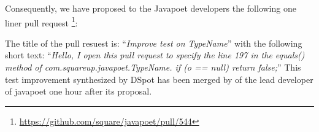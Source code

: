 \documentclass[table,xcdraw,smallextended]{svjour3}
\begin{document}
Consequently, we have proposed to the Javapoet developers the following one liner pull request \footnote{\url{https://github.com/square/javapoet/pull/544}}:
\begin{figure}[H]
    \centering
\end{figure}
The title of the pull resuest is: ``\emph{Improve test on TypeName}'' with the following short text: ``\emph{Hello, I open this pull request to specify the line 197 in the equals() method of com.squareup.javapoet.TypeName. if (o == null) return false;}''
This test improvement synthesized by DSpot has been merged by of the lead developer of javapoet one hour after its proposal.


\end{document}
